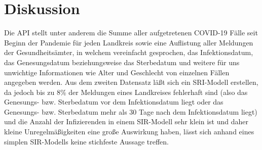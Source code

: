 \chapter{Diskussion}\label{chap:Diskussion}







Die API stellt unter anderem die Summe aller aufgetretenen COVID-19 Fälle seit Beginn der Pandemie für jeden Landkreis sowie eine Auflistung aller Meldungen der Gesundheitsämter, in welchem vereinfacht gesprochen, das Infektionsdatum, das Genesungsdatum beziehungsweise das Sterbedatum und weitere für uns unwichtige Informationen wie Alter und Geschlecht von einzelnen Fällen angegeben werden. Aus dem zweiten Datensatz läßt sich ein SRI-Modell erstellen, da jedoch bis zu 8\% der Meldungen eines Landkreises fehlerhaft sind (also das Genesungs- bzw. Sterbedatum vor dem Infektionsdatum liegt oder das Genesungs- bzw. Sterbedatum mehr als 30 Tage nach dem Infektionsdatum liegt) und die Anzahl der Infizierenden in einem SIR-Modell sehr klein ist und daher kleine Unregelmäßigkeiten eine große Auswirkung haben, lässt sich anhand eines simplen SIR-Modells keine stichfeste Aussage treffen.
